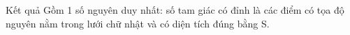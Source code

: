 Kết quả
Gồm 1 số nguyên duy nhất: số tam giác có đỉnh là các điểm có tọa độ nguyên nằm trong lưới chữ   nhật và có diện tích đúng bằng S.